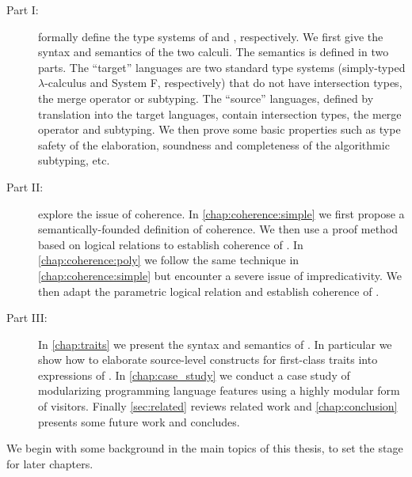 \begin{description}
\item[Part I:]  formally define the type systems of
  \namee and \fnamee, respectively. We first give the syntax and semantics of
  the two calculi. The semantics is defined in two parts. The ``target''
  languages are two standard type systems (simply-typed $\lambda$-calculus and
  System F, respectively) that do not have intersection types, the merge
  operator or subtyping. The ``source'' languages, defined by translation into
  the target languages, contain intersection types, the merge operator and
  subtyping. We then prove some basic properties such as type safety of
  the elaboration, soundness and completeness of the algorithmic subtyping, etc.
\item[Part II:]  explore the
  issue of coherence. In \cref{chap:coherence:simple} we first propose a
  semantically-founded definition of coherence. We then use a proof method based
  on logical relations to establish coherence of \namee. In
  \cref{chap:coherence:poly} we follow the same technique in
  \cref{chap:coherence:simple} but encounter a severe issue of impredicativity. We
  then adapt the parametric logical relation and establish coherence of \fnamee.
\item[Part III:] In \cref{chap:traits} we present the syntax and semantics of
  \sedel. In particular we show how to elaborate source-level constructs for
  first-class traits into expressions of \fnamee. In \cref{chap:case_study} we
  conduct a case study of modularizing programming language features using a
  highly modular form of visitors. Finally \cref{sec:related} reviews related
  work and \cref{chap:conclusion} presents some future work and concludes.
\end{description}

We begin with some background in the main topics of this thesis, to set the
stage for later chapters.


